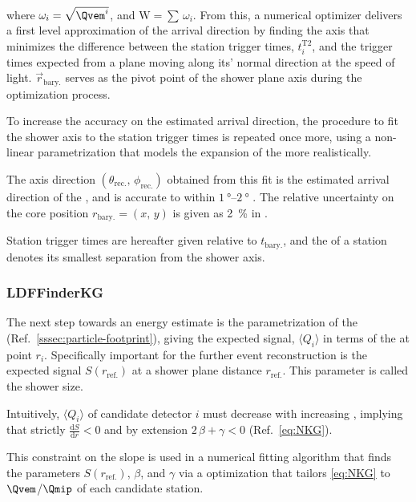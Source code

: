 where $\omega_i = \sqrt{\Qvem^i}$, and $\mathrm{W}=\sum\,\omega_i$. From this,
a numerical optimizer delivers a first level approximation of the \EAS arrival 
direction by finding the axis that minimizes the difference between the station
trigger times, $t_i^\mathrm{T2}$, and the trigger times expected from a plane 
moving along its' normal direction at the speed of light. 
$\vec{r}_\mathrm{bary.}$ serves as the pivot point of the shower plane axis 
during the optimization process.

To increase the accuracy on the estimated arrival direction, the procedure to 
fit the shower axis to the station trigger times is repeated once more, using a
non-linear parametrization that models the expansion of the \EAS more 
realistically. 

The axis direction $(\theta_\mathrm{rec.},\,\phi_\mathrm{rec.})$ obtained from
this fit is the estimated arrival direction of the \EAS, and is accurate to 
within $\SIrange{1}{2}{\degree}$ \cite{bonifaziAngularResolutionPierre2009}. 
The relative uncertainty on the core position $r_\mathrm{bary.} = (x,\,y)$ is 
given as \SI{2}{\percent} in \cite{ghiaStatisticalSystematicUncertainties2005}.

Station trigger times are hereafter given relative to $t_\mathrm{bary.}$, and 
the \SPD of a station denotes its smallest separation from the shower axis.

\subsubsection{LDFFinderKG}
\label{sssec:reconstruction-ldf-finder}

The next step towards an energy estimate is the parametrization of the \LDF 
(Ref.\ \cref{sssec:particle-footprint}), giving the expected signal, 
$\langle Q_{i} \rangle$ in terms of the \SPD at point $r_i$. Specifically
important for the further event reconstruction is the expected signal 
$S(r_\mathrm{ref.})$ at a shower plane distance $r_\mathrm{ref.}$. This 
parameter is called the shower size.

Intuitively, $\langle Q_i \rangle$ of candidate detector $i$ must decrease with
increasing \SPD, implying that strictly $\frac{\mathrm{d}S}{\mathrm{d}r}<0$ and
by extension $2\,\beta + \gamma < 0$ (Ref.\ \cref{eq:NKG}).

This constraint on the \LDF slope is used in a numerical fitting algorithm that
finds the parameters $S(r_\mathrm{ref.})$, $\beta$, and $\gamma$ via a \NLL 
optimization that tailors \cref{eq:NKG} to $\Qvem$/$\Qmip$ of each candidate 
station.


